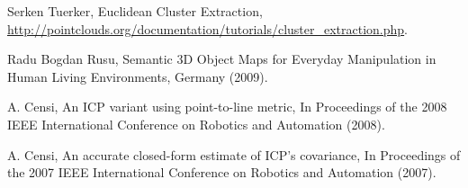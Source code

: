 \documentclass{llncs}
\begin{document}
\begin{thebibliography}{4}

 Serken Tuerker, Euclidean Cluster Extraction,\\
\url{http://pointclouds.org/documentation/tutorials/cluster_extraction.php}.

 Radu Bogdan Rusu, 
Semantic 3D Object Maps for Everyday Manipulation in Human Living Environments, Germany (2009).

 A. Censi, An ICP variant using point-to-line metric, In Proceedings of the 2008 IEEE International Conference on Robotics and Automation (2008).

 A. Censi, An accurate closed-form estimate of ICP's covariance, In Proceedings of the 2007 IEEE International Conference on Robotics and Automation (2007).

\end{thebibliography}
\end{document}
